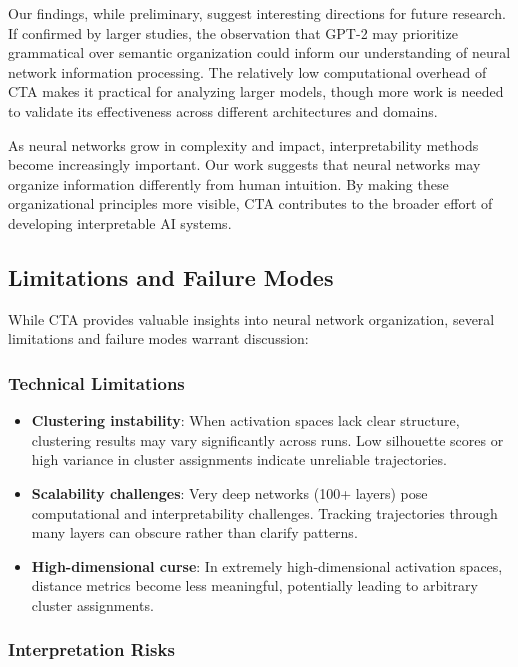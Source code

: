 Our findings, while preliminary, suggest interesting directions for future research. If confirmed by larger studies, the observation that GPT-2 may prioritize grammatical over semantic organization could inform our understanding of neural network information processing. The relatively low computational overhead of CTA makes it practical for analyzing larger models, though more work is needed to validate its effectiveness across different architectures and domains.

As neural networks grow in complexity and impact, interpretability methods become increasingly important. Our work suggests that neural networks may organize information differently from human intuition. By making these organizational principles more visible, CTA contributes to the broader effort of developing interpretable AI systems.

\subsection{Limitations and Failure Modes}

While CTA provides valuable insights into neural network organization, several limitations and failure modes warrant discussion:

\subsubsection{Technical Limitations}

\begin{itemize}
    \item \textbf{Clustering instability}: When activation spaces lack clear structure, clustering results may vary significantly across runs. Low silhouette scores or high variance in cluster assignments indicate unreliable trajectories.
    \item \textbf{Scalability challenges}: Very deep networks (100+ layers) pose computational and interpretability challenges. Tracking trajectories through many layers can obscure rather than clarify patterns.
    \item \textbf{High-dimensional curse}: In extremely high-dimensional activation spaces, distance metrics become less meaningful, potentially leading to arbitrary cluster assignments.
\end{itemize}

\subsubsection{Interpretation Risks}

